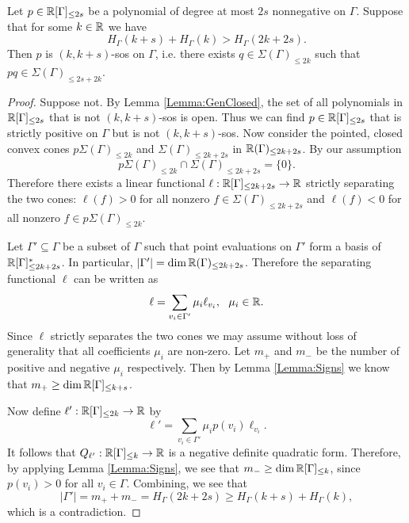 \begin{theorem}\label{Theorem:MainBound}
Let $p \in \mathbb{R}[\Gamma]_{\leq 2s}$ be a polynomial of degree at most $2s$ nonnegative on $\Gamma$. Suppose that for some $k \in \mathbb{R}$ we have
$$H_\Gamma(k+s)+H_\Gamma(k)>H_\Gamma(2k+2s).$$
Then $p$ is $(k,k+s)$-sos on $\Gamma$, i.e. there exists $q \in \Sigma(\Gamma)_{\leq 2k}$ such that $pq \in \Sigma(\Gamma)_{\leq 2s+2k}$.
\end{theorem}
\begin{proof}
Suppose not. By Lemma \ref{Lemma:GenClosed}, the set of all polynomials in $\mathbb{R}[\Gamma]_{\leq 2s}$ that is not $(k,k+s)$-sos is open. Thus we can find $p\in \mathbb{R}[\Gamma]_{\leq 2s}$ that is strictly positive on $\Gamma$ but is not $(k,k+s)$-sos. Now consider the pointed, closed convex cones $p\Sigma(\Gamma)_{\leq 2k}$ and $\Sigma(\Gamma)_{\leq 2k+2s}$ in $\mathbb{R}(\Gamma)_{\leq 2k+2s}$. By our assumption $$p\Sigma(\Gamma)_{\leq 2k} \cap \Sigma(\Gamma)_{\leq 2k+2s}=\{0\}.$$
Therefore there exists a linear functional $\ell:\mathbb{R}[\Gamma]_{\leq 2k+2s} \rightarrow \mathbb{R}$ strictly separating the two cones: $\ell(f)>0$ for all nonzero $f \in \Sigma(\Gamma)_{\leq 2k+2s}$ and $\ell(f)<0$ for all nonzero $f \in p\Sigma(\Gamma)_{\leq 2k}$. 

Let $\Gamma'\subseteq \Gamma$ be a subset of $\Gamma$ such that point evaluations on $\Gamma'$ form a basis of $\mathbb{R}[\Gamma]_{\leq 2k+2s}^*$. In particular, $|\Gamma'|=\dim \mathbb{R}(\Gamma)_{\leq 2k+2s}$. Therefore the separating functional $\ell$ can be written as 
$$\ell=\sum_{v_i \in \Gamma'} \mu_i\ell_{v_i}, \,\,\,\, \mu_i \in \mathbb{R}.$$
Since $\ell$ strictly separates the two cones we may assume without loss of generality that all coefficients $\mu_i$ are non-zero. Let $m_+$ and $m_-$ be the number of positive and negative $\mu_i$ respectively. Then by Lemma \ref{Lemma:Signs} we know that $m_+ \geq \dim \mathbb{R}[\Gamma]_{\leq k+s}$.

Now define $\ell': \mathbb{R}[\Gamma]_{\leq 2k} \rightarrow \mathbb{R}$ by $$\ell'=\sum_{v_i \in \Gamma'}\mu_ip(v_i)\ell_{v_i}.$$
It follows that $Q_{\ell'}:\mathbb{R}[\Gamma]_{\leq k} \rightarrow \mathbb{R}$ is a negative definite quadratic form. Therefore, by applying Lemma \ref{Lemma:Signs}, we see that $m_-\geq \dim \mathbb{R}[\Gamma]_{\leq k}$, since $p(v_i)>0$ for all $v_i\in \Gamma$. Combining, we see that $$|\Gamma'|=m_+ + m_-=H_\Gamma(2k+2s) \geq H_\Gamma(k+s)+H_\Gamma(k),$$
which is a contradiction.
\end{proof}

